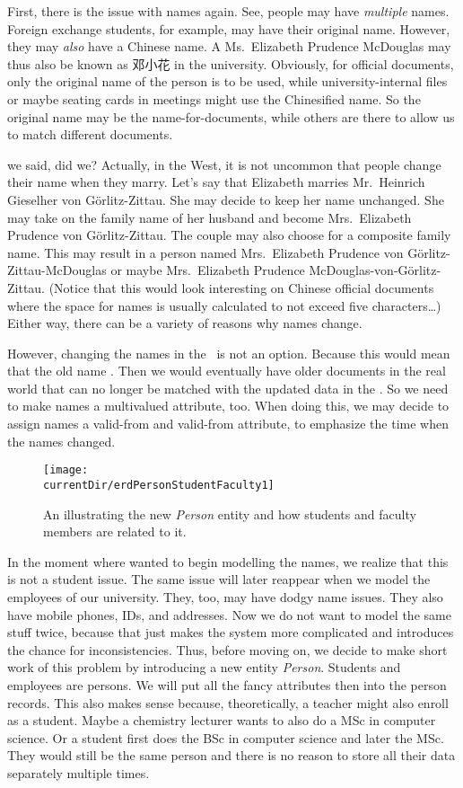 First, there is the issue with names again.
See, people may have \emph{multiple} names.
Foreign exchange students, for example, may have their original name.
However, they may \emph{also} have a Chinese name.
A Ms.~Elizabeth Prudence McDouglas may thus also be known as 邓小花 in the university.
Obviously, for official documents, only the original name of the person is to be used, while university-internal files or maybe seating cards in meetings might use the Chinesified name.
So the original name may be the name-for-documents, while others are there to allow us to match different documents.

 we said, did we?
Actually, in the West, it is not uncommon that people change their name when they marry.
Let's say that Elizabeth marries Mr.~Heinrich Gieselher von G{\"o}rlitz-Zittau.
She may decide to keep her name unchanged.
She may take on the family name of her husband and become Mrs.~Elizabeth Prudence von G{\"o}rlitz-Zittau.
The couple may also choose for a composite family name.
This may result in a person named Mrs.~Elizabeth Prudence von G{\"o}rlitz-Zittau-McDouglas or maybe Mrs.~Elizabeth Prudence McDouglas-von-G{\"o}rlitz-Zittau.
(Notice that this would look interesting on Chinese official documents where the space for names is usually calculated to not exceed five characters\dots)
Either way, there can be a variety of reasons why names change.

However, changing the names in the \db\ is not an option.
Because this would mean that the old name .
Then we would eventually have older documents in the real world that can no longer be matched with the updated data in the \db.
So we need to make names a multivalued attribute, too.
When doing this, we may decide to assign names a valid-from and valid-from attribute, to emphasize the time when the names changed.

\begin{figure}%
\centering%
\texttt{[image: \\currentDir/erdPersonStudentFaculty1]}%
\caption{An  illustrating the new \emph{Person} entity and how students and faculty members are related to it.}%
\label{fig:erdPersonStudentFaculty1}%
\end{figure}%

In the moment where wanted to begin modelling the names, we realize that this is not a student issue.
The same issue will later reappear when we model the employees of our university.
They, too, may have dodgy name issues.
They also have mobile phones, IDs, and addresses.
Now we do not want to model the same stuff twice, because that just makes the system more complicated and introduces the chance for inconsistencies.
Thus, before moving on, we decide to make short work of this problem by introducing a new entity \emph{Person}.
Students and employees are persons.
We will put all the fancy attributes then into the person records.
This also makes sense because, theoretically, a teacher might also enroll as a student.
Maybe a chemistry lecturer wants to also do a MSc in computer science.
Or a student first does the BSc in computer science and later the MSc.
They would still be the same person and there is no reason to store all their data separately multiple times.%

